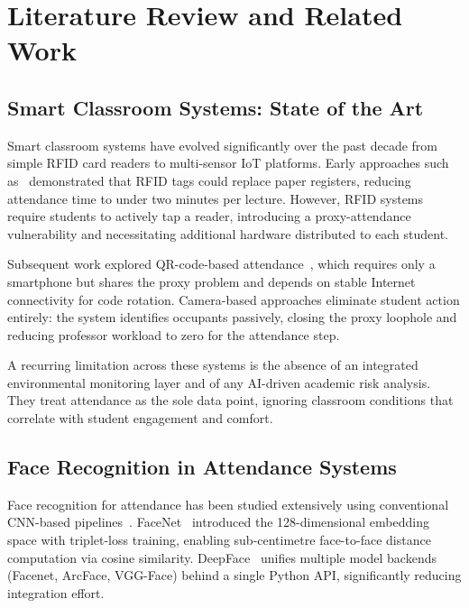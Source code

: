 \section{Literature Review and Related Work}
\label{sec:literature}

\subsection{Smart Classroom Systems: State of the Art}
\label{subsec:lit_smart}

Smart classroom systems have evolved significantly over the past decade
from simple RFID card readers to multi-sensor IoT platforms.  Early
approaches such as~\cite{rfid_attendance_2018} demonstrated that RFID
tags could replace paper registers, reducing attendance time to under
two minutes per lecture.  However, RFID systems require students to
actively tap a reader, introducing a proxy-attendance vulnerability and
necessitating additional hardware distributed to each student.

Subsequent work explored QR-code-based attendance~\cite{qr_attend_2020},
which requires only a smartphone but shares the proxy problem and depends
on stable Internet connectivity for code rotation.  Camera-based
approaches eliminate student action entirely: the system identifies
occupants passively, closing the proxy loophole and reducing
professor workload to zero for the attendance step.

A recurring limitation across these systems is the absence of an
integrated environmental monitoring layer and of any AI-driven academic
risk analysis.  They treat attendance as the sole data point, ignoring
classroom conditions that correlate with student engagement and comfort.

\subsection{Face Recognition in Attendance Systems}
\label{subsec:lit_face}

Face recognition for attendance has been studied extensively using
conventional CNN-based pipelines~\cite{facenet_2015, deepface_2021}.
FaceNet~\cite{facenet_2015} introduced the 128-dimensional embedding
space with triplet-loss training, enabling sub-centimetre face-to-face
distance computation via cosine similarity.  DeepFace~\cite{deepface_2021}
unifies multiple model backends (Facenet, ArcFace, VGG-Face) behind a
single Python API, significantly reducing integration effort.

